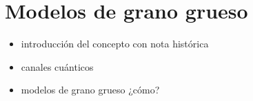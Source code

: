 \section{Modelos de grano grueso}
\begin{itemize}
\item introducción del concepto con nota histórica
\item canales cuánticos
\item modelos de grano grueso ¿cómo?
\end{itemize}

